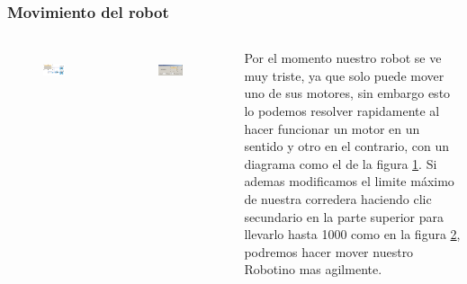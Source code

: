 \begin{frame}
	\frametitle{Movimiento del robot}
	\begin{columns}
		\begin{figure}
			\begin{center}
				\includegraphics[width=0.9\textwidth]{images/03-movimiento/02.png}
				\label{fig:movimiento-02}
			\end{center}
		\end{figure}

		\begin{figure}
			\begin{center}
				\includegraphics[width=0.8\textwidth]{images/03-movimiento/03.png}
				\label{fig:movimiento-03}
			\end{center}
		\end{figure}

		Por el momento nuestro robot se ve muy triste, ya que solo puede mover uno de sus motores, sin embargo esto lo podemos resolver rapidamente al hacer funcionar un motor en un sentido y otro en el contrario, con un diagrama como el de la figura \ref{fig:movimiento-02}. Si ademas modificamos el limite máximo de nuestra corredera haciendo clic secundario en la parte superior para llevarlo hasta 1000 como en la figura \ref{fig:movimiento-03}, podremos hacer mover nuestro Robotino mas agilmente.
	\end{columns}
\end{frame}

